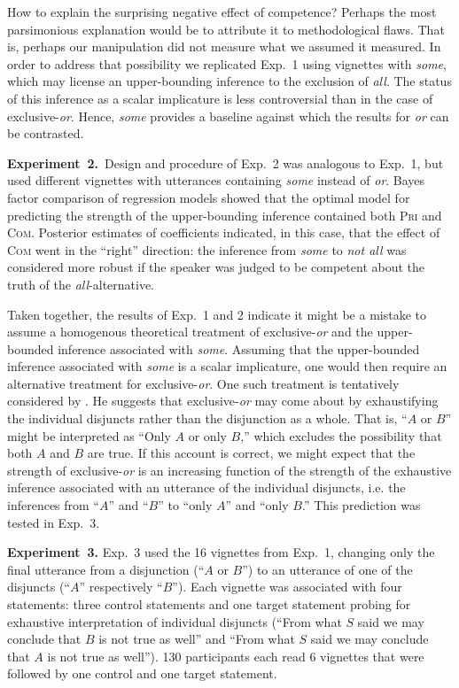 \documentclass[12pt]{article}
\newcommand{\acro}[1]{\textsc{#1}\xspace}
\newcommand{\com}{\acro{Com}}
\newcommand{\pri}{\acro{Pri}}
\begin{document}
How to explain the surprising negative effect of competence? Perhaps the most parsimonious
explanation would be to attribute it to methodological flaws. That is, perhaps our manipulation
did not measure what we assumed it measured. In order to address that possibility we replicated
Exp.~1 using vignettes with \emph{some}, which may license an upper-bounding inference to
the exclusion of \emph{all}. The status of this inference as a scalar implicature is less
controversial than in the case of exclusive-\emph{or}. Hence, \emph{some} provides a baseline
against which the results for \emph{or} can be contrasted.

\medskip

\noindent \textbf{Experiment~2.}\ Design and procedure of Exp.~2 was analogous to Exp.~1, but
used different vignettes with utterances containing \emph{some} instead of \emph{or}. Bayes
factor comparison of regression models showed that the optimal model for predicting the
strength of the upper-bounding inference contained both \pri and \com. Posterior estimates of
coefficients indicated, in this case, that the effect of \com went in the ``right'' direction:
the inference from \emph{some} to \emph{not all} was considered more robust if the speaker was
judged to be competent about the truth of the \emph{all}-alternative.

Taken together, the results of Exp.~1 and 2 indicate it might be a mistake to assume a
homogenous theoretical treatment of exclusive-\emph{or} and the upper-bounded inference
associated with \emph{some}. Assuming that the upper-bounded inference associated with
\emph{some} is a scalar implicature, one would then require an alternative treatment for
exclusive-\emph{or}. One such treatment is tentatively considered by
\citet{Fox2007:Free-Choice-and}. He suggests that exclusive-\emph{or} may come about by
exhaustifying the individual disjuncts rather than the disjunction as a whole. That is, ``$A$
or $B$'' might be interpreted as ``Only $A$ or only $B$,'' which excludes the possibility that
both $A$ and $B$ are true. If this account is correct, we might expect that the strength of
exclusive-\emph{or} is an increasing function of the strength of the exhaustive inference
associated with an utterance of the individual disjuncts, i.e. the inferences from ``$A$'' and
``$B$'' to ``only $A$'' and ``only $B$.'' This prediction was tested in Exp.~3.

\medskip

\noindent \textbf{Experiment~3.} Exp.~3 used the 16 vignettes from Exp.~1, changing only the
final utterance from a disjunction (``$A$ or $B$'') to an utterance of one of the disjuncts
(``$A$'' respectively ``$B$''). Each vignette was associated with four statements: three
control statements and one target statement probing for exhaustive interpretation of individual
disjuncts (``From what $S$ said we may conclude that $B$ is not true as well'' and ``From what
$S$ said we may conclude that $A$ is not true as well''). 130 participants each read 6
vignettes that were followed by one control and one target statement.
\end{document}
